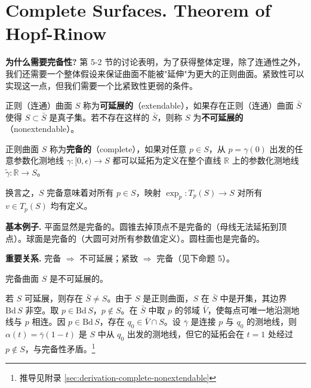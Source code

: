 \section{Complete Surfaces. Theorem of Hopf-Rinow}\label{sec:hopf-rinow}

\textbf{为什么需要完备性?} 第 5-2 节的讨论表明，为了获得整体定理，除了连通性之外，我们还需要一个整体假设来保证曲面不能被"延伸"为更大的正则曲面。紧致性可以实现这一点，但我们需要一个比紧致性更弱的条件。

\begin{Definition}[可延展与不可延展]\label{def:extendable}
正则（连通）曲面 $S$ 称为\textbf{可延展的}（extendable），如果存在正则（连通）曲面 $\bar{S}$ 使得 $S \subset \bar{S}$ 是真子集。若不存在这样的 $\bar{S}$，则称 $S$ 为\textbf{不可延展的}（nonextendable）。
\end{Definition}

\begin{Definition}[完备曲面]\label{def:complete-surface}
正则曲面 $S$ 称为\textbf{完备的}（complete），如果对任意 $p \in S$，从 $p = \gamma(0)$ 出发的任意参数化测地线 $\gamma: [0,\epsilon) \to S$ 都可以延拓为定义在整个直线 $\mathbb{R}$ 上的参数化测地线 $\tilde{\gamma}: \mathbb{R} \to S$。
\end{Definition}

换言之，$S$ 完备意味着对所有 $p \in S$，映射 $\exp_p: T_p(S) \to S$ 对所有 $v \in T_p(S)$ 均有定义。

\textbf{基本例子.} 平面显然是完备的。圆锥去掉顶点不是完备的（母线无法延拓到顶点）。球面是完备的（大圆可对所有参数值定义）。圆柱面也是完备的。

\textbf{重要关系.} 完备 $\Rightarrow$ 不可延展；紧致 $\Rightarrow$ 完备（见下命题 5）。

\begin{Proposition}\label{prop:complete-implies-nonextendable}
完备曲面 $S$ 是不可延展的。
\end{Proposition}

\begin{Proof}
若 $S$ 可延展，则存在 $\bar{S} \neq S$。由于 $S$ 是正则曲面，$S$ 在 $\bar{S}$ 中是开集，其边界 $\mathrm{Bd}\,S$ 非空。取 $p \in \mathrm{Bd}\,S$，$p \notin S$。在 $\bar{S}$ 中取 $p$ 的邻域 $\bar{V}$，使每点可唯一地沿测地线与 $p$ 相连。因 $p \in \mathrm{Bd}\,S$，存在 $q_0 \in \bar{V} \cap S$。设 $\bar{\gamma}$ 是连接 $p$ 与 $q_0$ 的测地线，则 $\alpha(t) = \bar{\gamma}(1-t)$ 是 $S$ 中从 $q_0$ 出发的测地线，但它的延拓会在 $t=1$ 处经过 $p \notin S$，与完备性矛盾。\footnote{推导见附录 \cref{sec:derivation-complete-nonextendable}}
\end{Proof}

